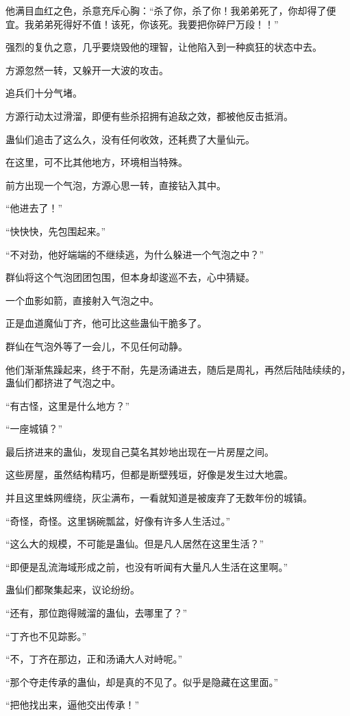 \begin{this_body}
他满目血红之色，杀意充斥心胸：“杀了你，杀了你！我弟弟死了，你却得了便宜。我弟弟死得好不值！该死，你该死。我要把你碎尸万段！！”

强烈的复仇之意，几乎要烧毁他的理智，让他陷入到一种疯狂的状态中去。

方源忽然一转，又躲开一大波的攻击。

追兵们十分气堵。

方源行动太过滑溜，即便有些杀招拥有追敌之效，都被他反击抵消。

蛊仙们追击了这么久，没有任何收效，还耗费了大量仙元。

在这里，可不比其他地方，环境相当特殊。

前方出现一个气泡，方源心思一转，直接钻入其中。

“他进去了！”

“快快快，先包围起来。”

“不对劲，他好端端的不继续逃，为什么躲进一个气泡之中？”

群仙将这个气泡团团包围，但本身却逡巡不去，心中猜疑。

一个血影如箭，直接射入气泡之中。

正是血道魔仙丁齐，他可比这些蛊仙干脆多了。

群仙在气泡外等了一会儿，不见任何动静。

他们渐渐焦躁起来，终于不耐，先是汤诵进去，随后是周礼，再然后陆陆续续的，蛊仙们都挤进了气泡之中。

“有古怪，这里是什么地方？”

“一座城镇？”

最后挤进来的蛊仙，发现自己莫名其妙地出现在一片房屋之间。

这些房屋，虽然结构精巧，但都是断壁残垣，好像是发生过大地震。

并且这里蛛网缠绕，灰尘满布，一看就知道是被废弃了无数年份的城镇。

“奇怪，奇怪。这里锅碗瓢盆，好像有许多人生活过。”

“这么大的规模，不可能是蛊仙。但是凡人居然在这里生活？”

“即便是乱流海域形成之前，也没有听闻有大量凡人生活在这里啊。”

蛊仙们都聚集起来，议论纷纷。

“还有，那位跑得贼溜的蛊仙，去哪里了？”

“丁齐也不见踪影。”

“不，丁齐在那边，正和汤诵大人对峙呢。”

“那个夺走传承的蛊仙，却是真的不见了。似乎是隐藏在这里面。”

“把他找出来，逼他交出传承！”


\end{this_body}

